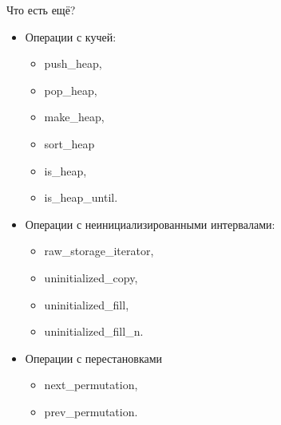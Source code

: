 \documentclass{beamer}
\begin{document}
\begin{frame}[fragile]{Что есть ещё?}
\begin{itemize}
    \item Операции с кучей:
        \begin{itemize}
            \tt 
            \item push\_heap, 
            \item pop\_heap, 
            \item make\_heap, 
            \item sort\_heap
            \item is\_heap,
            \item is\_heap\_until.
            
        \end{itemize}
    \item Операции с неинициализированными интервалами:
        \begin{itemize}
            \tt
            \item raw\_storage\_iterator,
            \item uninitialized\_copy,
            \item uninitialized\_fill,
            \item uninitialized\_fill\_n.
        \end{itemize}
    \item Операции с перестановками
        \begin{itemize}
            \tt 
            \item next\_permutation,
            \item prev\_permutation.
        \end{itemize}
\end{itemize}
\end{frame}
\end{document}
